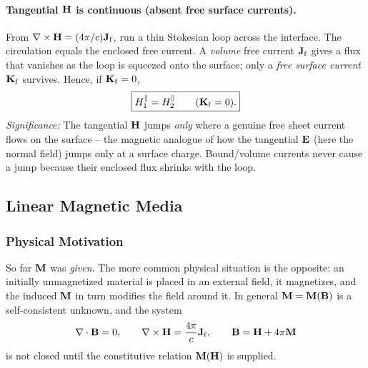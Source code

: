 \paragraph{Tangential $\mathbf{H}$ is continuous (absent free surface currents).}
From $\nabla\times\mathbf{H}=(4\pi/c)\mathbf{J}_{\rm f}$, run a thin Stokesian loop across the
interface. The circulation equals the enclosed free current. A \emph{volume} free
current $\mathbf{J}_{\rm f}$ gives a flux that vanishes as the loop is squeezed onto the
surface; only a \emph{free surface current} $\mathbf{K}_{\rm f}$ survives. Hence, if
$\mathbf{K}_{\rm f}=0$,
\begin{equation}\label{eq:lec18-Hpar}
  \boxed{H^{\parallel}_{1}=H^{\parallel}_{2}\qquad(\mathbf{K}_{\rm f}=0).}
\end{equation}
\textit{Significance:} The tangential $\mathbf{H}$ jumps \emph{only} where a genuine free
sheet current flows on the surface -- the magnetic analogue of how the tangential $\mathbf{E}$
(here the normal field) jumps only at a surface charge. Bound/volume currents never cause
a jump because their enclosed flux shrinks with the loop.


\subsection{Linear Magnetic Media}\label{subsec:lec18-linear}

\subsubsection*{Physical Motivation}
So far $\mathbf{M}$ was \emph{given}. The more common physical situation is the opposite:
an initially unmagnetized material is placed in an external field, it magnetizes, and the
induced $\mathbf{M}$ in turn modifies the field around it. In general $\mathbf{M}=\mathbf{M}(\mathbf{B})$
is a self-consistent unknown, and the system
\begin{equation}\label{eq:lec18-system}
  \nabla \cdot\mathbf{B}=0,\qquad
  \nabla\times\mathbf{H}=\frac{4\pi}{c}\mathbf{J}_{\rm f},\qquad
  \mathbf{B}=\mathbf{H}+4\pi\mathbf{M}
\end{equation}
is not closed until the constitutive relation $\mathbf{M}(\mathbf{H})$ is supplied.

